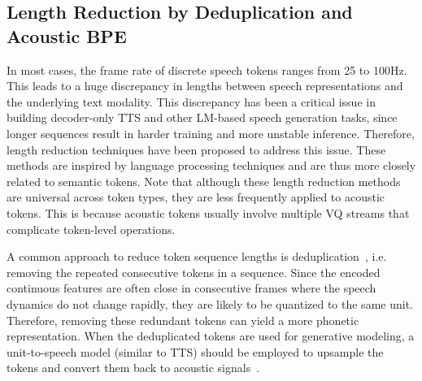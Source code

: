 
\subsection{Length Reduction by Deduplication and Acoustic BPE}
\label{sec:dedup-bpe}
In most cases, the frame rate of discrete speech tokens ranges from 25 to 100Hz.
This leads to a huge discrepancy in lengths between speech representations and the underlying text modality.
This discrepancy has been a critical issue in building decoder-only TTS and other LM-based speech generation tasks, since longer sequences result in harder training and more unstable inference.
Therefore, length reduction techniques have been proposed to address this issue. 
These methods are inspired by language processing techniques and are thus more closely related to semantic tokens. 
Note that although these length reduction methods are universal across token types, they are less frequently applied to acoustic tokens. 
This is because acoustic tokens usually involve multiple VQ streams that complicate token-level operations.

A common approach to reduce token sequence lengths is deduplication~\cite{chang23b_interspeech,chang2024exploring}, i.e. removing the repeated consecutive tokens in a sequence.
Since the encoded continuous features are often close in consecutive frames where the speech dynamics do not change rapidly, they are likely to be quantized to the same unit.
Therefore, removing these redundant tokens can yield a more phonetic representation.
When the deduplicated tokens are used for generative modeling, a unit-to-speech model (similar to TTS) should be employed to upsample the tokens and convert them back to acoustic signals~\cite{lakhotia2021generative}.

